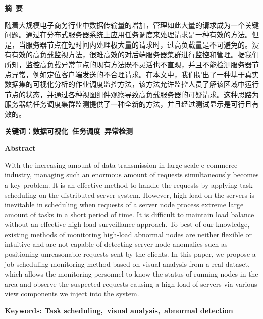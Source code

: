 
\begin{center}
	\Large{\textbf{摘\ 要}}
\end{center}

随着大规模电子商务行业中数据传输量的增加，管理如此大量的请求成为一个关键问题。通过在分布式服务器系统上应用任务调度来处理请求是一种有效的方法。但是，当服务器节点在短时间内处理极大量的请求时，过高负载量是不可避免的。没有有效的高负载监视方法，很难高效的对后端服务器集群进行监控和管理。据我们所知，监控高负载异常节点的现有方法既不灵活也不直观，并且不能检测服务器节点异常，例如定位客户端发送的不合理请求。在本文中，我们提出了一种基于真实数据集的可视化分析的作业调度监控方法，该方法允许监控人员了解该区域中运行节点的状态，并通过各种视图组件观察导致高负载服务器的可疑请求。这种思路为服务器端任务调度集群监测提供了一种全新的方法，并且经过测试显示是可行且有效的。
	
	\textbf{关键词：数据可视化\ 任务调度\ 异常检测}


\newpage


\begin{center}
	\large{\textbf{Abstract}}
\end{center}

With the increasing amount of data transmission in large-scale e-commerce industry, managing such an enormous amount of requests simultaneously becomes a key problem. It is an effective method to handle the requests by applying task scheduling on the distributed server system. However, high load on the servers is inevitable in scheduling when requests of a server node process extreme large amount of tasks in a short period of time. It is difficult to maintain load balance without an effective high-load surveillance approach. To best of our knowledge, existing methods of monitoring high-load abnormal nodes are neither flexible or intuitive and are not capable of detecting server node anomalies such as positioning unreasonable requests sent by the clients. In this paper, we propose a job scheduling monitoring method based on visual analysis from a real dataset, which allows the monitoring personnel to know the status of running nodes in the area and observe the suspected requests causing a high load of servers via various view components we inject into the system.

\textbf{Keywords: Task scheduling,\ visual analysis,\ abnormal detection}



\newpage
